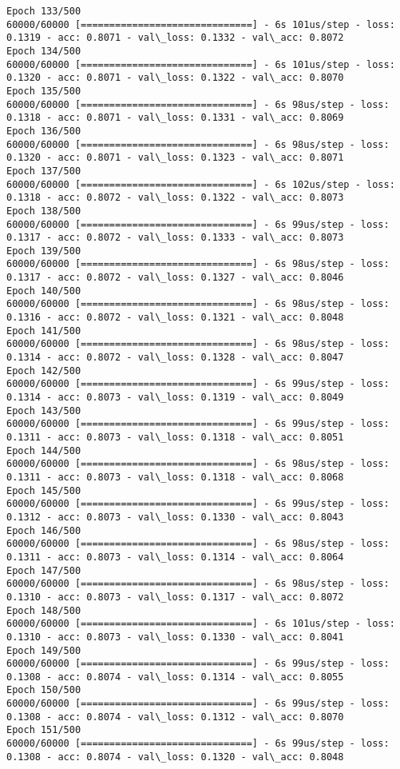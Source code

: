 \documentclass[11pt]{article}
\begin{document}
\begin{Verbatim}[commandchars=\\\{\}]
Epoch 133/500
60000/60000 [==============================] - 6s 101us/step - loss: 0.1319 - acc: 0.8071 - val\_loss: 0.1332 - val\_acc: 0.8072
Epoch 134/500
60000/60000 [==============================] - 6s 101us/step - loss: 0.1320 - acc: 0.8071 - val\_loss: 0.1322 - val\_acc: 0.8070
Epoch 135/500
60000/60000 [==============================] - 6s 98us/step - loss: 0.1318 - acc: 0.8071 - val\_loss: 0.1331 - val\_acc: 0.8069
Epoch 136/500
60000/60000 [==============================] - 6s 98us/step - loss: 0.1320 - acc: 0.8071 - val\_loss: 0.1323 - val\_acc: 0.8071
Epoch 137/500
60000/60000 [==============================] - 6s 102us/step - loss: 0.1318 - acc: 0.8072 - val\_loss: 0.1322 - val\_acc: 0.8073
Epoch 138/500
60000/60000 [==============================] - 6s 99us/step - loss: 0.1317 - acc: 0.8072 - val\_loss: 0.1333 - val\_acc: 0.8073
Epoch 139/500
60000/60000 [==============================] - 6s 98us/step - loss: 0.1317 - acc: 0.8072 - val\_loss: 0.1327 - val\_acc: 0.8046
Epoch 140/500
60000/60000 [==============================] - 6s 98us/step - loss: 0.1316 - acc: 0.8072 - val\_loss: 0.1321 - val\_acc: 0.8048
Epoch 141/500
60000/60000 [==============================] - 6s 98us/step - loss: 0.1314 - acc: 0.8072 - val\_loss: 0.1328 - val\_acc: 0.8047
Epoch 142/500
60000/60000 [==============================] - 6s 99us/step - loss: 0.1314 - acc: 0.8073 - val\_loss: 0.1319 - val\_acc: 0.8049
Epoch 143/500
60000/60000 [==============================] - 6s 99us/step - loss: 0.1311 - acc: 0.8073 - val\_loss: 0.1318 - val\_acc: 0.8051
Epoch 144/500
60000/60000 [==============================] - 6s 98us/step - loss: 0.1311 - acc: 0.8073 - val\_loss: 0.1318 - val\_acc: 0.8068
Epoch 145/500
60000/60000 [==============================] - 6s 99us/step - loss: 0.1312 - acc: 0.8073 - val\_loss: 0.1330 - val\_acc: 0.8043
Epoch 146/500
60000/60000 [==============================] - 6s 98us/step - loss: 0.1311 - acc: 0.8073 - val\_loss: 0.1314 - val\_acc: 0.8064
Epoch 147/500
60000/60000 [==============================] - 6s 98us/step - loss: 0.1310 - acc: 0.8073 - val\_loss: 0.1317 - val\_acc: 0.8072
Epoch 148/500
60000/60000 [==============================] - 6s 101us/step - loss: 0.1310 - acc: 0.8073 - val\_loss: 0.1330 - val\_acc: 0.8041
Epoch 149/500
60000/60000 [==============================] - 6s 99us/step - loss: 0.1308 - acc: 0.8074 - val\_loss: 0.1314 - val\_acc: 0.8055
Epoch 150/500
60000/60000 [==============================] - 6s 99us/step - loss: 0.1308 - acc: 0.8074 - val\_loss: 0.1312 - val\_acc: 0.8070
Epoch 151/500
60000/60000 [==============================] - 6s 99us/step - loss: 0.1308 - acc: 0.8074 - val\_loss: 0.1320 - val\_acc: 0.8048

\end{Verbatim}
\end{document}
